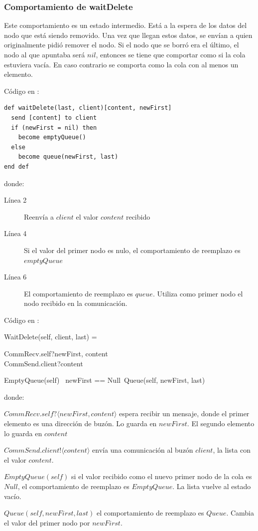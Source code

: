 \subsubsection*{Comportamiento de waitDelete}
Este comportamiento es un estado intermedio. Está a la espera de los datos del nodo que está siendo removido. Una vez que llegan estos datos, se envían a quien originalmente pidió remover el nodo. Si el nodo que se borró era el último, el nodo al que apuntaba será $nil$, entonces se tiene que comportar como si la cola estuviera vacía. En caso contrario se comporta como la cola con al menos un elemento.

Código en \SAL:

\begin{lstlisting}[language=sal, style=simple]
def waitDelete(last, client)[content, newFirst]
  send [content] to client
  if (newFirst = nil) then
    become emptyQueue()
  else
    become queue(newFirst, last)
end def
\end{lstlisting}
donde: 
\begin{description}
 \item [Línea 2] Reenvía a $client$ el valor $content$ recibido
 \item [Línea 4] Si el valor del primer nodo es nulo, el comportamiento de reemplazo es $emptyQueue$
 \item [Línea 6] El comportamiento de reemplazo es $queue$. Utiliza como primer nodo el nodo recibido en la comunicación.
\end{description}

Código en \CSP:

\begin{process}
WaitDelete(self, client, last) = \\ \quad
  \begin{block}
  CommRecv.self?\langle newFirst, content \rangle \then \\ 
  CommSend.client?\langle content \rangle \then \\ \quad
    \begin{block}
         EmptyQueue(self) \lceil\ newFirst == Null\ \rceil  Queue(self, newFirst, last) 
    \end{block} 
  \end{block}
\end{process}
donde:
\begin{description}
 \item $CommRecv.self?\langle newFirst, content \rangle$ espera recibir un mensaje, donde el primer elemento es una dirección de buzón. Lo guarda en $newFirst$. El segundo elemento lo guarda en $content$
 \item $CommSend.client!\langle content \rangle$ envía una comunicación al buzón $client$, la lista con el valor $content$. 
 \item $EmptyQueue(self)$ si el valor recibido como el nuevo primer nodo de la cola es $Null$, el comportamiento de reemplazo es $EmptyQueue$. La lista vuelve al estado vacío.
 \item $Queue(self, newFirst, last)$ el comportamiento de reemplazo es $Queue$. Cambia el valor del primer nodo por $newFirst$.
 \end{description}
 
